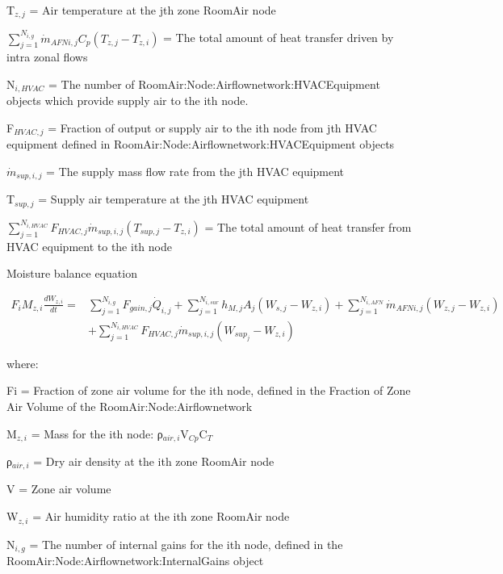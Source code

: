 {T\(_{z,j}\) = Air temperature at the jth zone RoomAir node

\({\sum\limits_{j = 1}^{N_{i,g}} \dot m_{AFN i,j} {C_p}\left( T_{z,j} - T_{z,i} \right)}\) = The total amount of heat transfer driven by intra zonal flows

N\(_{i,HVAC}\) = The number of RoomAir:Node:Airflownetwork:HVACEquipment objects which provide supply air to the ith node.

F\(_{HVAC,j}\) = Fraction of output or supply air to the ith node from jth HVAC equipment defined in RoomAir:Node:Airflownetwork:HVACEquipment objects

\({\dot m}_{sup,i,j}\) = The supply mass flow rate from the jth HVAC equipment

T\(_{sup,j}\) = Supply air temperature at the jth HVAC equipment

\({\sum\limits_{j = 1}^{N_{i,HVAC}} F_{HVAC,j} \dot m_{sup,i,j} \left( T_{sup,j} - T_{z,i}\right)}\) = The total amount of heat transfer from HVAC equipment to the ith node

Moisture balance equation

\begin{equation}
\begin{split}
{F_i}{M_{z,i}}\frac{{d{W_{z,i}}}}{{dt}} =& \sum\limits_{j = 1}^{{N_{i,g}}} {{F_{gain,j}{\dot Q}_{i,j}}}  + \sum\limits_{j = 1}^{{N_{i,sur}}} {{h_{M,j}}} {A_j}\left( {{W_{s,j}} - {W_{z,i}}} \right) + \sum\limits_{j = 1}^{{N_{i,AFN}}} {{{\dot m}_{AFN i,j}}} \left( {{W_{z,j}} - {W_{z,i}}} \right)\, \\
&+ \sum\limits_{j = 1}^{{N_{i,HVAC}}} {{{F_{HVAC,j}}{\dot m}_{sup,i,j}}} \left( {{W_{sup_j}} - {W_{z,i}}} \right)
\end{split}
\end{equation}

where:

Fi = Fraction of zone air volume for the ith node, defined in the Fraction of Zone Air Volume of the RoomAir:Node:Airflownetwork

M\(_{z,i}\) = Mass for the ith node: ρ\(_{air,i}\)V\(_{Cp}\)C\(_{T}\)

ρ\(_{air,i}\) = Dry air density at the ith zone RoomAir node

V = Zone air volume

W\(_{z,i}\) = Air humidity ratio at the ith zone RoomAir node

N\(_{i,g}\) = The number of internal gains for the ith node, defined in the \\ RoomAir:Node:Airflownetwork:InternalGains object

}

